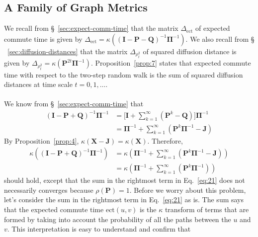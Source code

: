 \documentclass[10pt,twocolumn]{article}
\numberwithin{equation}{section}
\begin{document}
\subsection{A Family of Graph Metrics}
\label{general_graph_metrics}
We recall from \S ~\ref{sec:expect-comm-time} that the matrix
$\Delta_{\mathrm{ect}}$ of expected commute time is given by
$\Delta_{\mathrm{ect}} = \kappa((\mathbf{I} - \mathbf{P} -
\mathbf{Q})^{-1}\bm{\Pi}^{-1})$. We also recall from \S
~\ref{sec:diffusion-distances} that the matrix $\Delta_{\rho_{t}^{2}}$
of squared diffusion distance is given by $\Delta_{\rho_{t}^{2}} =
\kappa(\mathbf{P}^{2t}\bm{\Pi}^{-1})$. Proposition~\ref{prop:7}
states that expected commute time with respect to the two-step random
walk is the sum of squared diffusion distances at time scale
$t=0,1,\dots$. \\
\\
\noindent
We know from \S~\ref{sec:expect-comm-time} that
\begin{equation}
  \label{eq:20}
  \begin{split}
    (\mathbf{I} - \mathbf{P} + \mathbf{Q})^{-1}\bm{\Pi}^{-1} &=
    \biggl[\mathbf{I} + \sum_{k=1}^{\infty}{(\mathbf{P}^{k} -
      \mathbf{Q})}\biggr]\bm{\Pi}^{-1} \\
    & = \bm{\Pi}^{-1} +
    \sum_{k=1}^{\infty}{(\mathbf{P}^{k}\bm{\Pi}^{-1} - \mathbf{J})}
  \end{split}
\end{equation}
By Proposition~\ref{prop:4}, $\kappa(\mathbf{X} -
\mathbf{J}) = \kappa(\mathbf{X})$. Therefore,
\begin{equation}
  \label{eq:21}
  \begin{split}
    \kappa((\mathbf{I} - \mathbf{P} + \mathbf{Q})^{-1}\bm{\Pi}^{-1})
    &= \kappa(\bm{\Pi}^{-1} +
    \sum_{k=1}^{\infty}{(\mathbf{P}^{k}\bm{\Pi}^{-1} - \mathbf{J})}) \\
    &= \kappa(\bm{\Pi}^{-1} +
    \sum_{k=1}^{\infty}{(\mathbf{P}^{k}\bm{\Pi}^{-1})})
  \end{split}
\end{equation}
should hold, except that the sum in the rightmost term in
Eq.~\eqref{eq:21} does not necessarily converges because 
$\rho(\mathbf{P}) = 1$. Before we worry about this problem, let's
consider the sum in the rightmost term in Eq.~\eqref{eq:21} as is. The sum
says that the expected commute time $\mathrm{ect}(u,v)$ is the
$\kappa$ transform of terms that are formed by taking into account the
probability of all the paths between the $u$ and $v$. This
interpretation is easy to understand and confirm that
\end{document}
